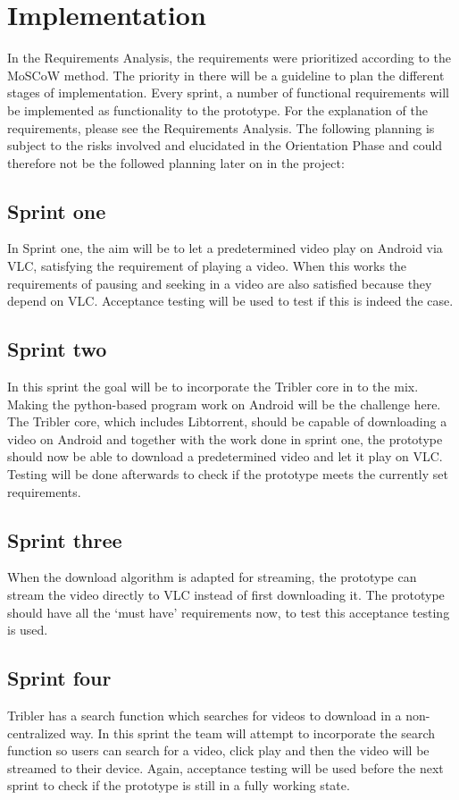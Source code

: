 \chapter{Implementation}
\label{sec:impl}
In the Requirements Analysis, the requirements were prioritized according to the MoSCoW method. The priority in there will be a guideline to plan the different stages of implementation. Every sprint, a number of functional requirements will be implemented as functionality to the prototype. For the explanation of the requirements, please see the Requirements Analysis. The following planning is subject to the risks involved and elucidated in the Orientation Phase and could therefore not be the followed planning later on in the project:

\section{Sprint one}
In Sprint one, the aim will be to let a predetermined video play on Android via VLC, satisfying the requirement of playing a video. When this works the requirements of pausing and seeking in a video are also satisfied because they depend on VLC. Acceptance testing will be used to test if this is indeed the case.
\section{Sprint two}
In this sprint the goal will be to incorporate the Tribler core in to the mix. Making the python-based program work on Android will be the challenge here. The Tribler core, which includes Libtorrent, should be capable of downloading a video on Android and together with the work done in sprint one, the prototype should now be able to download a predetermined video and let it play on VLC. Testing will be done afterwards to check if the prototype meets the currently set requirements.
\section{Sprint three}
When the download algorithm is adapted for streaming, the prototype can stream the video directly to VLC instead of first downloading it. The prototype should have all the `must have' requirements now, to test this acceptance testing is used.
\section{Sprint four}
Tribler has a search function which searches for videos to download in a non-centralized way. In this sprint the team will attempt to incorporate the search function so users can search for a video, click play and then the video will be streamed to their device. Again, acceptance testing will be used before the next sprint to check if the prototype is still in a fully working state.
